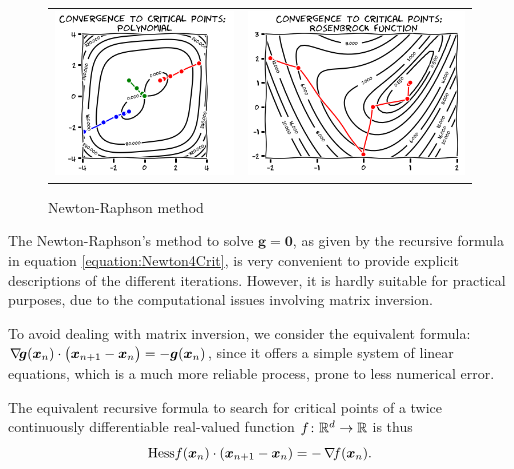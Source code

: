 \begin{figure}[ht!]
\begin{tabular}{cc}
\includegraphics[width=0.45\linewidth]{images/convergenceNewton.png} &
\includegraphics[width=0.55\linewidth]{images/convergenceNewtonRosenbrock.png} 
\end{tabular}
\caption{Newton-Raphson method}
\label{figure:NewtonConvergence}
\end{figure}

\begin{remark}
The Newton-Raphson's method to solve $\boldsymbol{g}=\boldsymbol{0}$, as given by the recursive formula in equation \eqref{equation:Newton4Crit}, is very convenient to provide explicit descriptions of the different iterations.  However, it is hardly suitable for practical purposes, due to the computational issues involving matrix inversion.

To avoid dealing with matrix inversion, we consider the equivalent formula: $\mathop{\nabla\! {\boldsymbol{g}}}(\boldsymbol{x}_n) \cdot \big( \boldsymbol{x}_{n+1} - \boldsymbol{x}_n \big) = -\boldsymbol{g}(\boldsymbol{x}_n)$, since it offers a simple system of linear equations, which is a much more reliable process, prone to less numerical error.

The equivalent recursive formula to search for critical points of a twice continuously differentiable real-valued function $f \colon \mathbb{R}^d \to \mathbb{R}$ is thus
\begin{equation}\index{Newton-Raphson method}\index{Newton-Raphson method!recursive formula}\index{Newton-Raphson method!iteration}
\Hess{f}(\x_n) \cdot (\x_{n+1}-\x_n) = -\gradient{f}(\x_n).
\end{equation}
\end{remark}

